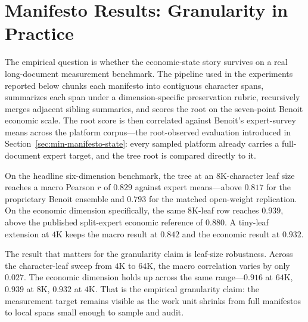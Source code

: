 \section{Manifesto Results: Granularity in Practice}\label{sec:min-manifesto-results}

The empirical question is whether the economic-state story survives on a
real long-document measurement benchmark. The pipeline used in the
experiments reported below chunks each manifesto into contiguous
character spans, summarizes each span under a dimension-specific
preservation rubric, recursively merges adjacent sibling summaries, and
scores the root on the seven-point Benoit economic scale. The root
score is then correlated against Benoit's expert-survey means across
the platform corpus---the root-observed evaluation introduced in
Section~\ref{sec:min-manifesto-state}: every sampled platform already
carries a full-document expert target, and the tree root is compared
directly to it.

On the headline six-dimension benchmark, the tree at an
$8\mathrm{K}$-character leaf size reaches a macro Pearson $r$ of
$0.829$ against expert means---above $0.817$ for the proprietary
Benoit ensemble and $0.793$ for the matched open-weight replication.
On the economic dimension specifically, the same $8\mathrm{K}$-leaf
row reaches $0.939$, above the published split-expert economic
reference of $0.880$. A tiny-leaf extension at $4\mathrm{K}$ keeps the
macro result at $0.842$ and the economic result at $0.932$.

\begin{table}[t]
    \centering
    \resizebox{\linewidth}{!}{}
    \caption{Pearson $r$ against Benoit expert-survey means. The minimal
    main text uses this table for the headline comparison and the
    economic running example; protocol details, coverage, controls, and
    ablations are in Appendix~\ref{app:min-manifesto}.}
    \label{tab:min-benoit-headline}
\end{table}

The result that matters for the granularity claim is leaf-size
robustness. Across the character-leaf sweep from $4\mathrm{K}$ to
$64\mathrm{K}$, the macro correlation varies by only $0.027$. The
economic dimension holds up across the same range---$0.916$ at
$64\mathrm{K}$, $0.939$ at $8\mathrm{K}$, $0.932$ at $4\mathrm{K}$.
That is the empirical granularity claim: the measurement target
remains visible as the work unit shrinks from full manifestos to
local spans small enough to sample and audit.

